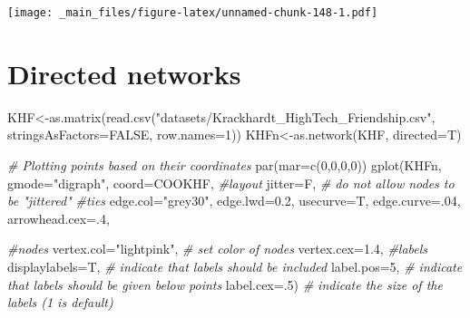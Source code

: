\documentclass[
  notitlepage,
  onecolumn,
  openany]{book}
\newenvironment{Shaded}{\begin{snugshade}}{\end{snugshade}}
\newcommand{\AttributeTok}[1]{\textcolor[rgb]{0.77,0.63,0.00}{#1}}
\newcommand{\CommentTok}[1]{\textcolor[rgb]{0.56,0.35,0.01}{\textit{#1}}}
\newcommand{\ConstantTok}[1]{\textcolor[rgb]{0.00,0.00,0.00}{#1}}
\newcommand{\DecValTok}[1]{\textcolor[rgb]{0.00,0.00,0.81}{#1}}
\newcommand{\FloatTok}[1]{\textcolor[rgb]{0.00,0.00,0.81}{#1}}
\newcommand{\FunctionTok}[1]{\textcolor[rgb]{0.00,0.00,0.00}{#1}}
\newcommand{\NormalTok}[1]{#1}
\newcommand{\OtherTok}[1]{\textcolor[rgb]{0.56,0.35,0.01}{#1}}
\newcommand{\StringTok}[1]{\textcolor[rgb]{0.31,0.60,0.02}{#1}}
\begin{document}
\texttt{[image: \_main\_files/figure-latex/unnamed-chunk-148-1.pdf]}

\hypertarget{directed-networks}{%
\section{Directed networks}\label{directed-networks}}

\begin{Shaded}
\begin{Highlighting}[]
\NormalTok{KHF}\OtherTok{\textless{}{-}}\FunctionTok{as.matrix}\NormalTok{(}\FunctionTok{read.csv}\NormalTok{(}\StringTok{"datasets/Krackhardt\_HighTech\_Friendship.csv"}\NormalTok{,}
                        \AttributeTok{stringsAsFactors=}\ConstantTok{FALSE}\NormalTok{, }\AttributeTok{row.names=}\DecValTok{1}\NormalTok{))}
\NormalTok{KHFn}\OtherTok{\textless{}{-}}\FunctionTok{as.network}\NormalTok{(KHF, }\AttributeTok{directed=}\NormalTok{T)}
\end{Highlighting}
\end{Shaded}

\begin{Shaded}
\begin{Highlighting}[]
\CommentTok{\# Plotting points based on their coordinates}
\FunctionTok{par}\NormalTok{(}\AttributeTok{mar=}\FunctionTok{c}\NormalTok{(}\DecValTok{0}\NormalTok{,}\DecValTok{0}\NormalTok{,}\DecValTok{0}\NormalTok{,}\DecValTok{0}\NormalTok{))}
\FunctionTok{gplot}\NormalTok{(KHFn,}
      \AttributeTok{gmode=}\StringTok{"digraph"}\NormalTok{,  }
      \AttributeTok{coord=}\NormalTok{COOKHF,}
      \CommentTok{\#layout}
      \AttributeTok{jitter=}\NormalTok{F,           }\CommentTok{\# do not allow nodes to be "jittered"}
      \CommentTok{\#ties}
      \AttributeTok{edge.col=}\StringTok{"grey30"}\NormalTok{,}
      \AttributeTok{edge.lwd=}\FloatTok{0.2}\NormalTok{,}
      \AttributeTok{usecurve=}\NormalTok{T,}
      \AttributeTok{edge.curve=}\NormalTok{.}\DecValTok{04}\NormalTok{, }
      \AttributeTok{arrowhead.cex=}\NormalTok{.}\DecValTok{4}\NormalTok{,}
      
      \CommentTok{\#nodes}
      \AttributeTok{vertex.col=}\StringTok{"lightpink"}\NormalTok{,   }\CommentTok{\# set color of nodes}
      \AttributeTok{vertex.cex=}\FloatTok{1.4}\NormalTok{,}
      \CommentTok{\#labels}
      \AttributeTok{displaylabels=}\NormalTok{T,    }\CommentTok{\# indicate that labels should be included}
      \AttributeTok{label.pos=}\DecValTok{5}\NormalTok{,        }\CommentTok{\# indicate that labels should be given below points}
      \AttributeTok{label.cex=}\NormalTok{.}\DecValTok{5}\NormalTok{)       }\CommentTok{\# indicate the size of the labels (1 is default)}
\end{Highlighting}
\end{Shaded}
\end{document}
